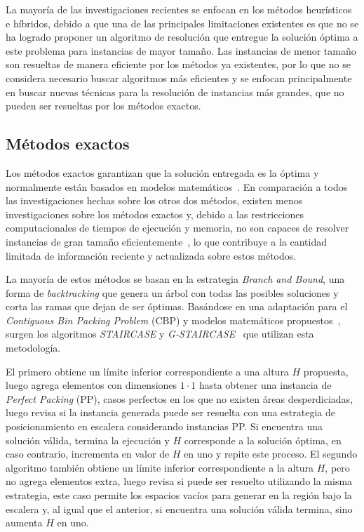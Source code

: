 \documentclass[letter, 10pt]{article}
\begin{document}
La mayor\'ia de las investigaciones recientes se enfocan en los m\'etodos heur\'isticos e h\'ibridos, debido a que una de las principales limitaciones existentes es que no se ha logrado proponer un algoritmo de resoluci\'on que entregue la soluci\'on \'optima a este problema para instancias de mayor tama\~no. Las instancias de menor tama\~no son resueltas de manera eficiente por los m\'etodos ya existentes, por lo que no se considera necesario buscar algoritmos m\'as eficientes y se enfocan principalmente en buscar nuevas t\'ecnicas para la resoluci\'on de instancias m\'as grandes, que no pueden ser resueltas por los m\'etodos exactos.

\subsection{M\'etodos exactos}

Los m\'etodos exactos garantizan que la soluci\'on entregada es la \'optima y normalmente est\'an basados en modelos matem\'aticos~\cite{oliveira2016survey}. En comparaci\'on a todos las investigaciones hechas sobre los otros dos m\'etodos, existen menos investigaciones sobre los m\'etodos exactos y, debido a las restricciones computacionales de tiempos de ejecuci\'on y memoria, no son capaces de resolver instancias de gran tama\~no eficientemente~\cite{he2013heuristics}, lo que contribuye a la cantidad limitada de informaci\'on reciente y actualizada sobre estos m\'etodos.

La mayor\'ia de estos m\'etodos se basan en la estrategia \emph{Branch and Bound}, una forma de \emph{backtracking} que genera un \'arbol con todas las posibles soluciones y corta las ramas que dejan de ser \'optimas. Bas\'andose en una adaptaci\'on para el \emph{Contiguous Bin Packing Problem} (CBP) y modelos matem\'aticos propuestos~\cite{martello2003exact}, surgen los algoritmos \emph{STAIRCASE} y \emph{G-STAIRCASE}~\cite{kenmochi2009exact} que utilizan esta metodolog\'ia.

El primero obtiene un l\'imite inferior correspondiente a una altura $H$ propuesta, luego agrega elementos con dimensiones $1 \cdot 1$ hasta obtener una instancia de \emph{Perfect Packing} (PP), casos perfectos en los que no existen \'areas desperdiciadas, luego revisa si la instancia generada puede ser resuelta con una estrategia de posicionamiento en escalera considerando instancias PP. Si encuentra una soluci\'on v\'alida, termina la ejecuci\'on y $H$ corresponde a la soluci\'on \'optima, en caso contrario, incrementa en valor de $H$ en uno y repite este proceso. El segundo algoritmo tambi\'en obtiene un l\'imite inferior correspondiente a la altura $H$, pero no agrega elementos extra, luego revisa si puede ser resuelto utilizando la misma estrategia, este caso permite los espacios vac\'ios para generar en la regi\'on bajo la escalera y, al igual que el anterior, si encuentra una soluci\'on v\'alida termina, sino aumenta $H$ en uno.
\end{document}
